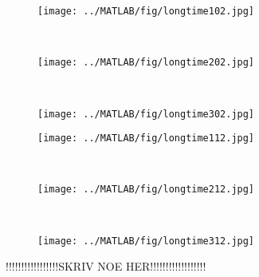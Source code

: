 \begin{figure}[H]
        \centering
        \begin{subfigure}[b]{0.3\textwidth}
                \texttt{[image: ../MATLAB/fig/longtime102.jpg]}
                \caption{  }
                \label{fig:longtime102}
        \end{subfigure}
        ~
        \begin{subfigure}[b]{0.3\textwidth}
                \texttt{[image: ../MATLAB/fig/longtime202.jpg]}
                \caption{  }
                \label{fig:longtime202}
        \end{subfigure}
        ~
        \begin{subfigure}[b]{0.3\textwidth}
                \texttt{[image: ../MATLAB/fig/longtime302.jpg]}
                \caption{  }
                \label{fig:longtime302}
        \end{subfigure}
        
        \begin{subfigure}[b]{0.3\textwidth}
                \texttt{[image: ../MATLAB/fig/longtime112.jpg]}
                \caption{  }
                \label{fig:longtime112}
        \end{subfigure}
        ~
        \begin{subfigure}[b]{0.3\textwidth}
                \texttt{[image: ../MATLAB/fig/longtime212.jpg]}
                \caption{  }
                \label{fig:longtime212}
        \end{subfigure}
        ~
        \begin{subfigure}[b]{0.3\textwidth}
                \texttt{[image: ../MATLAB/fig/longtime312.jpg]}
                \caption{  }
                \label{fig:longtime312}
        \end{subfigure}
        \caption{ !!!!!!!!!!!!!!!!!SKRIV NOE HER!!!!!!!!!!!!!!!!!!  }
        \label{fig:longtime2}
\end{figure}